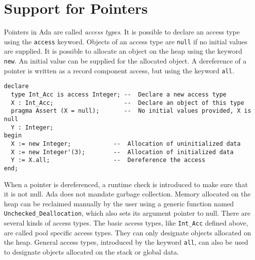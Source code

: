 \documentclass[runningheads]{llncs}
\begin{document}
\section{Support for Pointers\label{sec-pointers}}
Pointers in Ada are called \emph{access types}. It is possible to declare an access type using the \texttt{access} keyword.
Objects of an access type are \texttt{null} if no initial values are supplied.
It is possible to allocate an object on the heap using the keyword \texttt{new}. An initial value can be supplied for the allocated object.
A dereference of a pointer is written as a record component access, but using the keyword \texttt{all}.
\begin{lstlisting}
declare
  type Int_Acc is access Integer; --  Declare a new access type
  X : Int_Acc;                    --  Declare an object of this type
  pragma Assert (X = null);       --  No initial values provided, X is null
  Y : Integer;
begin
  X := new Integer;            --  Allocation of uninitialized data
  X := new Integer'(3);        --  Allocation of initialized data
  Y := X.all;                  --  Dereference the access
end;
\end{lstlisting}
When a pointer is dereferenced, a runtime check is introduced to make sure that it is not null.
Ada does not mandate garbage collection. Memory allocated on the heap can be reclaimed manually by the user using a generic function named \texttt{Unchecked\_Deallocation}, which also sets its argument pointer to null.
There are several kinds of access types. The basic access types, like \texttt{Int\_Acc} defined above, are called pool specific access types. They can only designate objects allocated on the heap. General access types, introduced by the keyword \texttt{all}, can also be used to designate objects allocated on the stack or global data.
\end{document}
